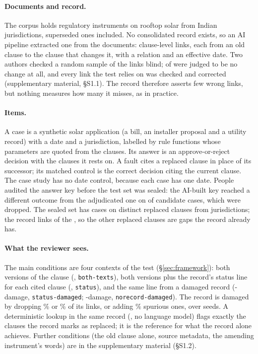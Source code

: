 \paragraph{Documents and record.}
The corpus holds \NCorpusDocs{} regulatory instruments on rooftop solar from \NCorpusJurisdictions{} Indian
jurisdictions, superseded ones included. No consolidated record exists, so an AI pipeline extracted one from the
documents: \NLinksRegistry{} clause-level links, each from an old clause to the clause that changes it, with a relation
and an effective date. Two authors checked a random sample of the links blind; \NLinksSampleNotALink{} of
\NLinksSample{} were judged to be no change at all, and every link the test relies on was checked and corrected
(supplementary material, \S S1.1). The record therefore asserts few wrong links, but nothing measures how many it
misses, as in practice.

\paragraph{Items.}
A case is a synthetic solar application (a bill, an installer proposal and a utility record) with a date and a
jurisdiction, labelled by rule functions whose parameters are quoted from the clauses. Its answer is an
approve-or-reject decision with the clauses it rests on. A fault cites a replaced clause in place of its successor; its
matched control is the correct decision citing the current clause. The case study has no date control, because each case has
one date. People audited the answer key before the test set was sealed: the AI-built key reached a different outcome
from the adjudicated one on \NDroppedDecision{} of \NCandidateCases{} candidate cases, which were dropped. The sealed
set has \NTestCases{} cases on \NClauses{} distinct replaced clauses from \NStates{} jurisdictions; the record links
\NRegistryFlagged{} of the \NClauses, so the other replaced clauses are gaps the record already has.

\paragraph{What the reviewer sees.}
The main conditions are four contexts of the test (\S\ref{sec:framework}): both versions of the clause (, \texttt{both-texts}),
both versions plus the record's status line for each cited clause (, \texttt{status}), and the same line from
a damaged record (-damage, \texttt{status-damaged}; -damage, \texttt{norecord-damaged}). The record
is damaged by dropping \DamageDropTwentyFive\% or \DamageDropFifty\% of its links, or adding \DamageSpuriousTen\%
spurious ones, over \NDamageSeeds{} seeds. A deterministic lookup in the same record (, no language model)
flags exactly the clauses the record marks as replaced; it is the reference for what the record alone achieves.
Further conditions (the old clause alone, source metadata, the amending instrument's words) are in the supplementary
material (\S S1.2).

